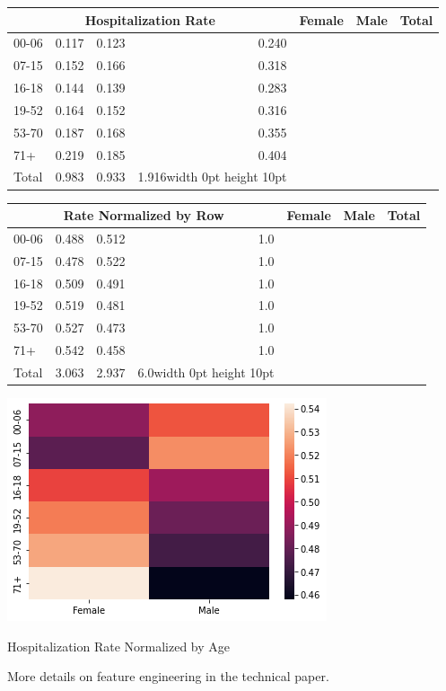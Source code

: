 \begin{center}
\begin{tabular}{lrrr}
\multicolumn{4}{c}{Hospitalization Rate} \cr
\toprule
{Age} &  Female &   Male &  Total \\
\midrule
00-06 &   0.117 &  0.123 &  0.240 \\
07-15 &   0.152 &  0.166 &  0.318 \\
16-18 &   0.144 &  0.139 &  0.283 \\
19-52 &   0.164 &  0.152 &  0.316 \\
53-70 &   0.187 &  0.168 &  0.355 \\
71+   &   0.219 &  0.185 &  0.404 \\ \hline
Total &   0.983 &  0.933 &  1.916\vrule width 0pt height 10pt \\
\bottomrule
\end{tabular}
\end{center}

\begin{center}
\begin{tabular}{lrrr}
\multicolumn{4}{c}{Rate Normalized by Row} \cr
\toprule
{Age} &  Female &   Male &  Total \\
\midrule
00-06 &   0.488 &  0.512 &    1.0 \\
07-15 &   0.478 &  0.522 &    1.0 \\
16-18 &   0.509 &  0.491 &    1.0 \\
19-52 &   0.519 &  0.481 &    1.0 \\
53-70 &   0.527 &  0.473 &    1.0 \\
71+   &   0.542 &  0.458 &    1.0 \\ \hline
Total &   3.063 &  2.937 &    6.0\vrule width 0pt height 10pt \\
\bottomrule
\end{tabular}
\end{center}

\begin{center}
\includegraphics[scale=0.6]{AGE_IM_SEX_IM_Row.png}

Hospitalization Rate Normalized by Age
\end{center}

More details on feature engineering in the technical paper.   


